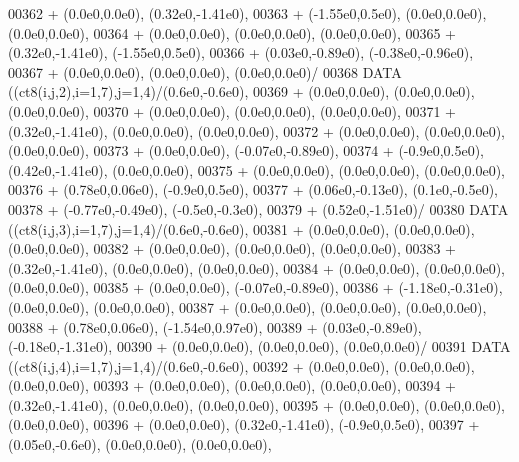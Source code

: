 \begin{DoxyCode}
00362      +                  (0.0e0,0.0e0), (0.32e0,-1.41e0),
00363      +                  (-1.55e0,0.5e0), (0.0e0,0.0e0), (0.0e0,0.0e0),
00364      +                  (0.0e0,0.0e0), (0.0e0,0.0e0), (0.0e0,0.0e0),
00365      +                  (0.32e0,-1.41e0), (-1.55e0,0.5e0),
00366      +                  (0.03e0,-0.89e0), (-0.38e0,-0.96e0),
00367      +                  (0.0e0,0.0e0), (0.0e0,0.0e0), (0.0e0,0.0e0)/
00368       \textcolor{keyword}{DATA}              ((ct8(i,j,2),i=1,7),j=1,4)/(0.6e0,-0.6e0),
00369      +                  (0.0e0,0.0e0), (0.0e0,0.0e0), (0.0e0,0.0e0),
00370      +                  (0.0e0,0.0e0), (0.0e0,0.0e0), (0.0e0,0.0e0),
00371      +                  (0.32e0,-1.41e0), (0.0e0,0.0e0), (0.0e0,0.0e0),
00372      +                  (0.0e0,0.0e0), (0.0e0,0.0e0), (0.0e0,0.0e0),
00373      +                  (0.0e0,0.0e0), (-0.07e0,-0.89e0),
00374      +                  (-0.9e0,0.5e0), (0.42e0,-1.41e0), (0.0e0,0.0e0),
00375      +                  (0.0e0,0.0e0), (0.0e0,0.0e0), (0.0e0,0.0e0),
00376      +                  (0.78e0,0.06e0), (-0.9e0,0.5e0),
00377      +                  (0.06e0,-0.13e0), (0.1e0,-0.5e0),
00378      +                  (-0.77e0,-0.49e0), (-0.5e0,-0.3e0),
00379      +                  (0.52e0,-1.51e0)/
00380       \textcolor{keyword}{DATA}              ((ct8(i,j,3),i=1,7),j=1,4)/(0.6e0,-0.6e0),
00381      +                  (0.0e0,0.0e0), (0.0e0,0.0e0), (0.0e0,0.0e0),
00382      +                  (0.0e0,0.0e0), (0.0e0,0.0e0), (0.0e0,0.0e0),
00383      +                  (0.32e0,-1.41e0), (0.0e0,0.0e0), (0.0e0,0.0e0),
00384      +                  (0.0e0,0.0e0), (0.0e0,0.0e0), (0.0e0,0.0e0),
00385      +                  (0.0e0,0.0e0), (-0.07e0,-0.89e0),
00386      +                  (-1.18e0,-0.31e0), (0.0e0,0.0e0), (0.0e0,0.0e0),
00387      +                  (0.0e0,0.0e0), (0.0e0,0.0e0), (0.0e0,0.0e0),
00388      +                  (0.78e0,0.06e0), (-1.54e0,0.97e0),
00389      +                  (0.03e0,-0.89e0), (-0.18e0,-1.31e0),
00390      +                  (0.0e0,0.0e0), (0.0e0,0.0e0), (0.0e0,0.0e0)/
00391       \textcolor{keyword}{DATA}              ((ct8(i,j,4),i=1,7),j=1,4)/(0.6e0,-0.6e0),
00392      +                  (0.0e0,0.0e0), (0.0e0,0.0e0), (0.0e0,0.0e0),
00393      +                  (0.0e0,0.0e0), (0.0e0,0.0e0), (0.0e0,0.0e0),
00394      +                  (0.32e0,-1.41e0), (0.0e0,0.0e0), (0.0e0,0.0e0),
00395      +                  (0.0e0,0.0e0), (0.0e0,0.0e0), (0.0e0,0.0e0),
00396      +                  (0.0e0,0.0e0), (0.32e0,-1.41e0), (-0.9e0,0.5e0),
00397      +                  (0.05e0,-0.6e0), (0.0e0,0.0e0), (0.0e0,0.0e0),

\end{DoxyCode}
